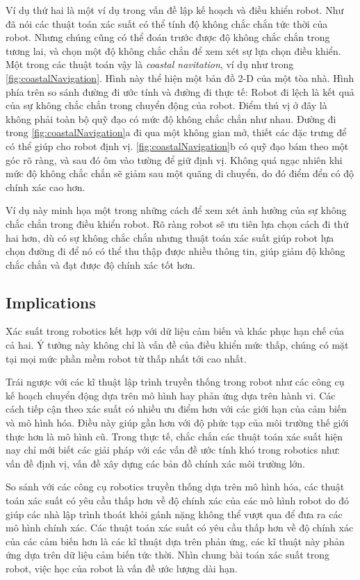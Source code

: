 Ví dụ thứ hai là một ví dụ trong vấn đề lập kế hoạch và điều khiển robot. Như đã nói các thuật toán xác suất có thể tính độ không chắc chắn tức thời của robot. Nhưng chúng cũng có thể đoán trước được độ không chắc chắn trong tương lai, và chọn một độ không chắc chắn để xem xét sự lựa chọn điều khiển. Một trong các thuật toán vậy là \textit{coastal navitation}, ví dụ như trong \figurename{\ref{fig:coastalNavigation}}. Hình này thể hiện một bản đồ 2-D của một tòa nhà. Hình phía trên so sánh đường đi ước tính và đường đi thực tế: Robot đi lệch là kết quả của sự không chắc chắn trong chuyển động của robot. Điểm thú vị ở đây là không phải toàn bộ quỹ đạo có mức độ không chắc chắn như nhau. Đường đi trong \figurename{\ref{fig:coastalNavigation}}a đi qua một không gian mở, thiết các đặc trưng để có thể giúp cho robot định vị.  \figurename{\ref{fig:coastalNavigation}}b có quỹ đạo bám theo một góc rõ ràng, và sau đó ôm vào tường để giữ định vị. Không quá ngạc nhiên khi mức độ không chắc chắn sẽ giảm sau một quãng di chuyển, do đó điểm đển có độ chính xác cao hơn.

Ví dụ này minh họa một trong những cách để xem xét ảnh hưởng của sự không chắc chắn trong điều khiển robot. Rõ ràng robot sẽ ưu tiên lựa chọn cách đi thứ hai hơn, dù có sự không chắc chắn nhưng thuật toán xác suất giúp robot lựa chọn đường đi để nó có thể thu thập được nhiều thông tin, giúp giảm độ không chắc chắn và đạt được độ chính xác tốt hơn.

\subsection{Implications}
Xác suất trong robotics kết hợp với dữ liệu cảm biến và khác phục hạn chế của cả hai. Ý tưởng này không chỉ là vấn đề của điều khiển mức thấp, chúng có mặt tại mọi mức phần mềm robot từ thấp nhất tới cao nhất. 

Trái ngược với các kĩ thuật lập trình truyền thống trong robot như các công cụ kế hoạch chuyển động dựa trên mô hình hay phản ứng dựa trên hành vi. Các cách tiếp cận theo xác suất có nhiều ưu điểm hơn với các giới hạn của cảm biến và mô hình hóa. Điều này giúp gần hơn với độ phức tạp của môi trường thế giới thực hơn là mô hình cũ. Trong thực tế, chắc chắn các thuật toán xác suất hiện nay chỉ mới biết các giải pháp với các vấn đề ước tính khó trong robotics như: vấn đề định vị, vấn đề xây dựng các bản đồ chính xác môi trường lớn. 

So sánh với các công cụ robotics truyền thống dựa trên mô hình hóa, các thuật toán xác suất có yêu cầu thấp hơn về độ chính xác của các mô hình robot do đó giúp các nhà lập trình thoát khỏi gánh nặng không thể vượt qua để đưa ra các mô hình chính xác. Các thuật toán xác suất có yêu cầu thấp hơn về độ chính xác của các cảm biến hơn là các kĩ thuật dựa trên phản ứng, các kĩ thuật này phản ứng dựa trên dữ liệu cảm biến tức thời. Nhìn chung bài toán xác suất trong robot, việc học của robot là vấn đề ước lượng dài hạn. 

